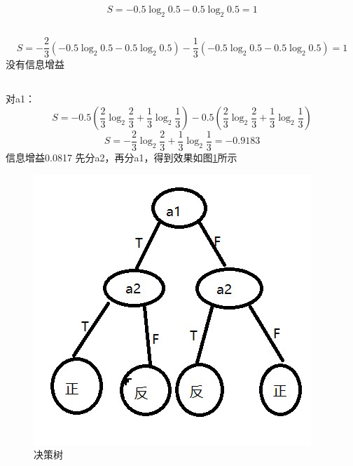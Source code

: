 \documentclass[UTF8,a4paper]{paper}
\begin{document}
\section{}
\subsection{}
$$S = -0.5\log_2 0.5-0.5\log_2 0.5 =1$$
\subsection{}
$$S = -\frac{2}{3}( -0.5\log_2 0.5-0.5\log_2 0.5)-\frac{1}{3}( -0.5\log_2 0.5-0.5\log_2 0.5)=1$$
没有信息增益
\subsection{}
对a1：
$$S = -0.5(\frac{2}{3}\log_2\frac{2}{3}+\frac{1}{3}\log_2\frac{1}{3})-0.5(\frac{2}{3}\log_2\frac{2}{3}+\frac{1}{3}\log_2\frac{1}{3})$$
$$S = -\frac{2}{3}\log_2\frac{2}{3}+\frac{1}{3}\log_2\frac{1}{3}=-0.9183$$
信息增益0.0817
先分a2，再分a1，得到效果如图\ref{f3}所示
\begin{figure}[H]
\centering
\includegraphics[width=\columnwidth]{3.jpg}
\caption{决策树}
\label{f3}
\end{figure}
\end{document}
